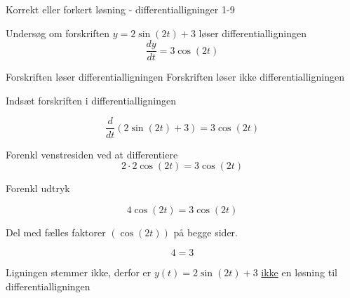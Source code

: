 \documentclass{article}
\begin{document}
\begin{exercise}{Korrekt eller forkert løsning - differentialligninger 1-9}


Undersøg om forskriften $y = 2 \sin(2t) + 3$ løser differentialligningen
\[
\frac{dy}{dt} = 3 \cos(2t)
\]

\begin{multichoice}
\itemfalse Forskriften løser differentialligningen
\itemtrue Forskriften løser ikke differentialligningen
\end{multichoice}

\hint

Indsæt forskriften i differentialligningen

\hint
\[
\frac{d}{dt} \left(2 \sin(2t) + 3\right) = 3 \cos(2t)
\]


\hint

Forenkl venstresiden ved at differentiere
\[
2 \cdot 2 \cos(2t) = 3 \cos(2t)
\]

\hint

Forenkl udtryk

\hint
\[
4 \cos(2t) = 3 \cos(2t)
\]

\hint
Del med fælles faktorer $\left(\cos(2t) \right)$ på begge sider.

\hint

\[
4 = 3
\]


\hint

Ligningen stemmer ikke, derfor er $y(t) = 2 \sin(2t) + 3$ \underline{ikke} en løsning til differentialligningen

\end{exercise}

\newpage
\end{document}
